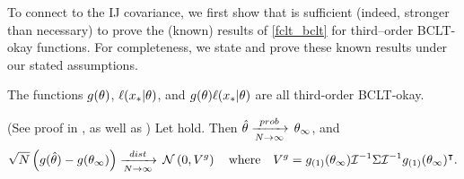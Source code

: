 






To connect  to the IJ covariance, we first show that
 is sufficient (indeed, stronger than necessary) to prove the
(known) results of \eqref{fclt_bclt} for third--order BCLT-okay functions. For completeness,
we state and prove these known results under  our stated assumptions.


\begin{assu}
    The functions $g(\theta)$, $\ell(x_{*} \vert \theta)$, and
    $g(\theta) \ell(x_{*} \vert \theta)$ are all third-order BCLT-okay.
\end{assu}


\begin{prop}(See proof in ,
    as well as \cite[Chapter 7]{van:2000:asymptotic})
%
Let  hold.
Then $\hat\theta \xrightarrow[N\rightarrow\infty]{prob}\, \theta_{\infty}$, and
%
\begin{align*}
\sqrt{N}\left(g(\hat\theta) - g(\theta_{\infty})\right)
\xrightarrow[N\rightarrow\infty]{dist}\,
\mathcal{N}\left(0, V^g \right)
\quad\textrm{where}\quad
V^g =
    g_{(1)}(\theta_{\infty})
    \mathcal{I}^{-1} \Sigma \mathcal{I}^{-1} g_{(1)}(\theta_{\infty})^\intercal.
\end{align*}
%
\end{prop}
%


